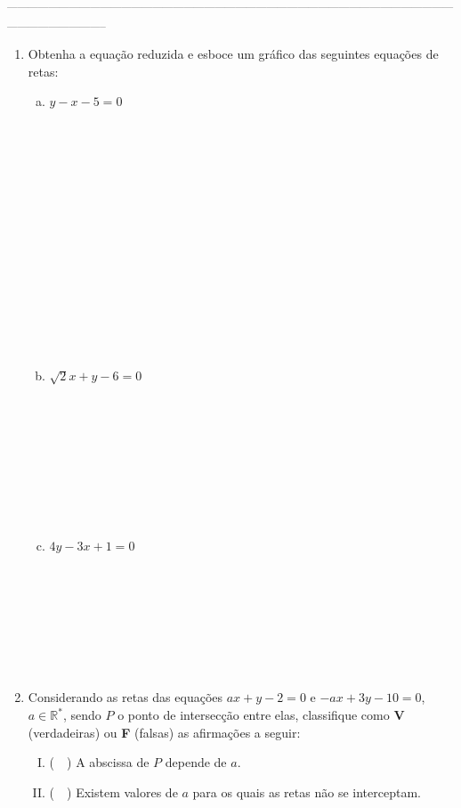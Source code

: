 \documentclass[a4paper,14pt]{article}
\begin{document}
	\noindent\textsubscript{--------------------------------------------------------------------------------------------------------------------------------------------------------------}
	\begin{multicols}{2}
		\begin{enumerate} 
			\item Obtenha a equação reduzida e esboce um gráfico das seguintes equações de retas:
			\begin{enumerate}[a)]
				\item $y - x - 5 = 0$ \\\\\\\\\\\\\\\\\\\\\\\\\\\\\\
				\item $\sqrt{2}x + y - 6 = 0$ \\\\\\\\\\\\\\\\\\
				\item $4y - 3x + 1 = 0$ \\\\\\\\\\\\\\\\
			\end{enumerate}
			\item Considerando as retas das equações $ax + y - 2 = 0$ e $-ax + 3y - 10 = 0$, $a \in \mathbb{R}^*$, sendo $P$ o ponto de intersecção entre elas, classifique como \textbf{V} (verdadeiras) ou \textbf{F} (falsas) as afirmações a seguir:
			\begin{enumerate}[I.]
				\item (~~) A abscissa de $P$ depende de $a$.
				\item (~~) Existem valores de $a$ para os quais as retas não se interceptam.

\end{enumerate}
\end{enumerate}
\end{multicols}
\end{document}
